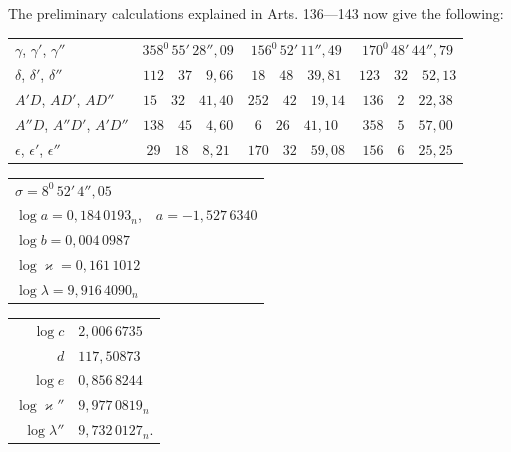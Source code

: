 The preliminary calculations explained in Arts. 136---143 now give the following:
\begin{center}\begingroup\footnotesize\setlength{\tabcolsep}{3pt}\renewcommand{\arraystretch}{1.3}
\begin{tabular}{l|c|c|c}
$\gamma$, $\gamma'$, $\gamma''$ & $358^0\,55'\,28''{,}09$ & $156^0\,52'\,11''{,}49$ & $170^0\,48'\,44''{,}79$ \\
$\delta$, $\delta'$, $\delta''$ & $112\quad37\quad9{,}66$ & $18\quad48\quad39{,}81$ & $123\quad32\quad52{,}13$ \\
$A'D$, $AD'$, $AD''$ & $15\quad32\quad41{,}40$ & $252\quad42\quad19{,}14$ & $136\quad2\quad22{,}38$ \\
$A''D$, $A''D'$, $A'D''$ & $138\quad45\quad4{,}60$ & $6\quad26\quad41{,}10$ & $358\quad5\quad57{,}00$ \\
$\epsilon$, $\epsilon'$, $\epsilon''$ & $29\quad18\quad8{,}21$ & $170\quad32\quad59{,}08$ & $156\quad6\quad25{,}25$ \\
\end{tabular}
\endgroup\end{center}
\begin{center}\begingroup\footnotesize\setlength{\tabcolsep}{3pt}\renewcommand{\arraystretch}{1.3}
\begin{tabular}{ll}
$\sigma=8^0\,52'\,4''{,}05$ & \\
$\log a=0{,}184\,0193_n$, & $a=-1{,}527\,6340$\\
$\log b=0{,}004\,0987$ & \\
$\log\varkappa=0{,}161\,1012$ & \\
$\log\lambda=9{,}916\,4090_n$ &
\end{tabular}
\par\smallskip
\begin{tabular}{r@{\;=\;}l}
$\log c$ & $2{,}006\,6735$\\
$d$ & $117{,}50873$\\
$\log e$ & $0{,}856\,8244$\\
$\log\varkappa''$ & $9{,}977\,0819_n$\\
$\log\lambda''$ & $9{,}732\,0127_n$.
\end{tabular}
\endgroup\end{center}

